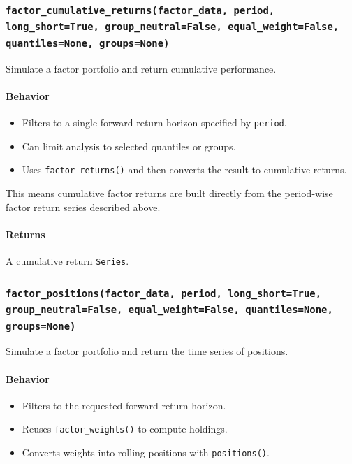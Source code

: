 \documentclass[11pt]{article}
\begin{document}
\subsubsection{\texttt{factor\_cumulative\_returns(factor\_data, period, long\_short=True, group\_neutral=False, equal\_weight=False, quantiles=None, groups=None)}}
Simulate a factor portfolio and return cumulative performance.

\paragraph{Behavior}
\begin{itemize}
  \item Filters to a single forward-return horizon specified by \texttt{period}.
  \item Can limit analysis to selected quantiles or groups.
  \item Uses \texttt{factor\_returns()} and then converts the result to cumulative returns.
\end{itemize}

This means cumulative factor returns are built directly from the period-wise factor return series described above.

\paragraph{Returns}
A cumulative return \texttt{Series}.

\subsubsection{\texttt{factor\_positions(factor\_data, period, long\_short=True, group\_neutral=False, equal\_weight=False, quantiles=None, groups=None)}}
Simulate a factor portfolio and return the time series of positions.

\paragraph{Behavior}
\begin{itemize}
  \item Filters to the requested forward-return horizon.
  \item Reuses \texttt{factor\_weights()} to compute holdings.
  \item Converts weights into rolling positions with \texttt{positions()}.
\end{itemize}
\end{document}
